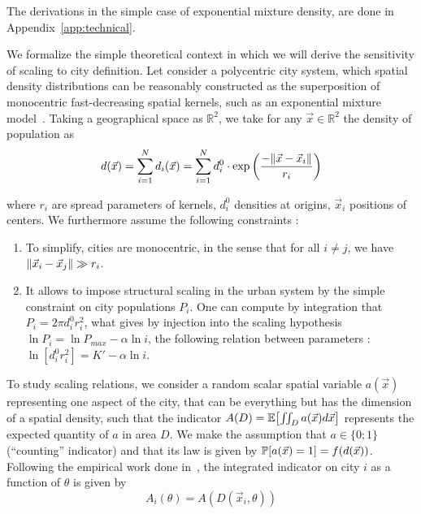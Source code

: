 The derivations in the simple case of exponential mixture density, are done in Appendix~\ref{app:technical}.







We formalize the simple theoretical context in which we will derive the sensitivity of scaling to city definition. Let consider a polycentric city system, which spatial density distributions can be reasonably constructed as the superposition of monocentric fast-decreasing spatial kernels, such as an exponential mixture model~\cite{anas1998urban}. Taking a geographical space as $\mathbb{R}^2$, we take for any $\vec{x}\in\mathbb{R}^2$ 
the density of population as
\begin{equation}
d(\vec{x}) = \sum_{i=1}^{N}{d_i(\vec{x})} = \sum_{i=1}^{N}{d_i^0\cdot \exp{\left(\frac{-\| \vec{x}-\vec{x}_i \|}{r_i}\right)}}
\end{equation}

where $r_i$ are spread parameters of kernels, $d_i^0$ densities at origins, $\vec{x}_i$ positions of centers. We furthermore assume the following constraints :

\begin{enumerate}
\item To simplify, cities are monocentric, in the sense that for all $i\neq j$, we have $\| \vec{x}_i - \vec{x}_j \|\gg r_i$.
\item It allows to impose structural scaling in the urban system by the simple constraint on city populations $P_i$. One can compute by integration that $P_i=2\pi d_i^0 r_i^2$, what gives by injection into the scaling hypothesis $\ln{P_i}=\ln{P_{max}}-\alpha \ln{i}$, the following relation between parameters : $\ln{\left[d_i^0 r_i^2\right]}=K' - \alpha \ln{i}$.
\end{enumerate}

To study scaling relations, we consider a random scalar spatial variable $a(\vec{x})$ representing one aspect of the city, that can be everything but has the dimension of a spatial density, such that the indicator $A(D)=\operatorname{\mathbb{E}}\!\left[\iint_D{a(\vec{x})d\vec{x}}\right]$ represents the expected quantity of $a$ in area $D$. We make the assumption that $a\in \{0;1\}$ (``counting'' indicator) and that its law is given by $\operatorname{\mathbb{P}}\!\left[a(\vec{x})=1\right]=f(d(\vec{x}))$. Following the empirical work done in~\cite{cottineau2015scaling}, the integrated indicator on city $i$ as a function of $\theta$ is given by
\[
A_i(\theta) = A(D(\vec{x}_i, \theta))
\]

